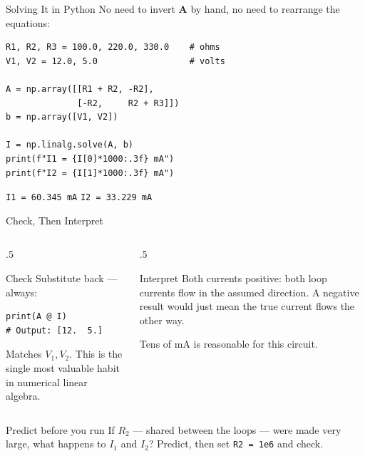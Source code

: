 \documentclass[9pt,aspectratio=169,xcolor=table]{beamer}
\begin{document}
\begin{frame}[fragile]{Solving It in Python}
    \leavevmode
    No need to invert $\mathbf{A}$ by hand, no need to rearrange the
    equations:

\begin{lstlisting}
R1, R2, R3 = 100.0, 220.0, 330.0    # ohms
V1, V2 = 12.0, 5.0                  # volts

A = np.array([[R1 + R2, -R2],
              [-R2,     R2 + R3]])
b = np.array([V1, V2])

I = np.linalg.solve(A, b)
print(f"I1 = {I[0]*1000:.3f} mA")
print(f"I2 = {I[1]*1000:.3f} mA")
\end{lstlisting}

    \texttt{I1 = 60.345 mA} \quad \texttt{I2 = 33.229 mA}
\end{frame}

\begin{frame}[fragile]{Check, Then Interpret}
    \leavevmode
    \begin{columns}[t]
        \begin{column}{.5\textwidth}
            \begin{block}{Check}
                Substitute back --- \alert{always}:
\begin{lstlisting}
print(A @ I)
# Output: [12.  5.]
\end{lstlisting}
                Matches $V_1, V_2$. This is the single most valuable
                habit in numerical linear algebra.
            \end{block}
        \end{column}
        \begin{column}{.5\textwidth}
            \begin{block}{Interpret}
                \small Both currents positive: both loop currents flow
                in the assumed direction. A negative result would just
                mean the true current flows the other way.

                \vspace{1mm}
                Tens of mA is reasonable for this circuit.
            \end{block}
        \end{column}
    \end{columns}

    \vspace{3mm}
    \begin{alertblock}{Predict before you run}
        If $R_2$ --- shared between the loops --- were made very large,
        what happens to $I_1$ and $I_2$? Predict, then set
        \texttt{R2 = 1e6} and check.
    \end{alertblock}
\end{frame}
\end{document}
